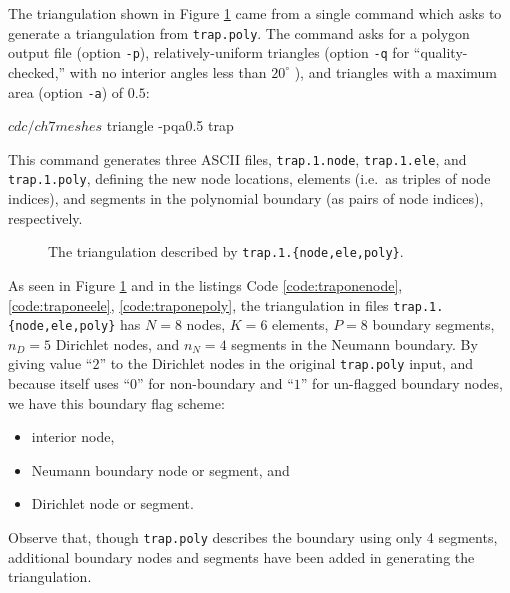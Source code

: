 
The triangulation shown in Figure \ref{fig:un:trapone} came from a single command which asks \Triangle to generate a triangulation from \texttt{trap.poly}.  The command asks for a polygon output file (option \texttt{-p}), relatively-uniform triangles (option \texttt{-q} for ``quality-checked,'' with no interior angles less than $20^\circ$ \citep{Shewchuk1996}), and triangles with a maximum area (option \texttt{-a}) of $0.5$:
\begin{cline}
$ cd c/ch7meshes
$ triangle -pqa0.5 trap
\end{cline}
This command generates three ASCII files, \texttt{trap.1.node}, \texttt{trap.1.ele}, and \texttt{trap.1.poly}, defining the new node locations, elements (i.e.~as triples of node indices), and segments in the polynomial boundary (as pairs of node indices), respectively.

\begin{figure}

\caption{The triangulation described by \texttt{trap.1.\{node,ele,poly\}}.}
\label{fig:un:trapone}
\end{figure}



As seen in Figure \ref{fig:un:trapone} and in the listings Code \ref{code:traponenode}, \ref{code:traponeele}, \ref{code:traponepoly}, the triangulation in files \texttt{trap.1.\{node,ele,poly\}} has $N=8$ nodes, $K=6$ elements, $P=8$ boundary segments, $n_D=5$ Dirichlet nodes, and $n_N=4$ segments in the Neumann boundary.  By giving value ``$2$'' to the Dirichlet nodes in the original \texttt{trap.poly} input, and because \Triangle itself uses ``$0$'' for non-boundary and ``$1$'' for un-flagged boundary nodes, we have this boundary flag scheme:
\begin{itemize}
\item[0] interior node,
\item[1] Neumann boundary node or segment, and
\item[2] Dirichlet node or segment.
\end{itemize}
Observe that, though \texttt{trap.poly} describes the boundary using only 4 segments, additional boundary nodes and segments have been added in generating the triangulation.

